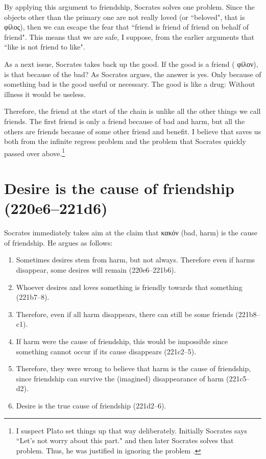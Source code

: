 \documentclass[11pt]{article}
\begin{document}
By applying this argument to friendship, Socrates solves one problem.  Since
the objects other than the primary one are not really loved (or ``beloved",
that is {\g φίλος}), then we can escape the fear that ``friend is friend of
friend on behalf of friend".  This means that we are safe, I suppose, from the
earlier arguments that ``like is not friend to like".

As a next issue, Socrates takes back up the good.  If the good is a friend ({\g
φίλον}), is that because of the bad?  As Socrates argues, the answer is yes.
Only because of something bad is the good useful or necessary.  The good is
like a drug: Without illness it would be useless.

Therefore, the friend at the start of the chain is unlike all the other things
we call friends.  The first friend is only a friend because of bad and harm,
but all the others are friends because of some other friend and benefit.
I believe that saves us both from the infinite regress problem and the problem
that Socrates quickly passed over above.\footnote{I suspect Plato set things up
that way deliberately.  Initially Socrates says ``Let's not worry about this
part." and then later Socrates solves that problem.  Thus, he was justified in
ignoring the problem .}


\section{Desire is the cause of friendship (220e6--221d6)}

Socrates immediately takes aim at the claim that {\g κακόν} (bad, harm) is
the cause of friendship.  He argues as follows:

\begin{enumerate}

    \item Sometimes desires stem from harm, but not always.  Therefore even
        if harms disappear, some desires will remain (220e6--221b6).

    \item Whoever desires and loves something is friendly towards that
        something (221b7--8).

    \item Therefore, even if all harm disappears, there can still be some
        friends (221b8--c1).

    \item If harm were the cause of friendship, this would be impossible
        since something cannot occur if its cause disappears (221c2--5).

    \item Therefore, they were wrong to believe that harm is the cause of
        friendship, since friendship can survive the (imagined)
        disappearance of harm (221c5--d2).

    \item Desire is the true cause of friendship (221d2--6).

\end{enumerate}
\end{document}
